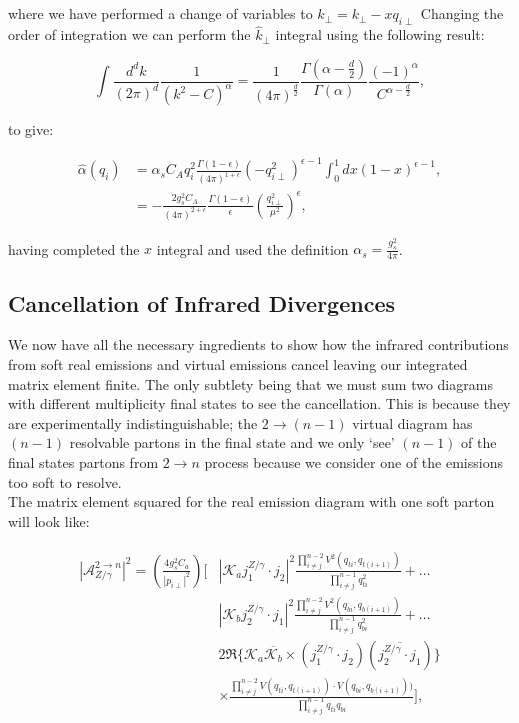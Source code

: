 		where we have performed a change of variables to $\hat{k}_\perp = k_\perp - xq_{i\perp}$
		Changing the order of integration we can perform the $\hat{k}_\perp$ integral
		using the following result:

		\begin{equation}
			\int \frac{d^dk}{(2\pi)^d}\frac{1}{(k^2 - C)^\alpha} = \frac{1}{(4\pi)^{\frac{d}{2}}}
				\frac{\Gamma(\alpha - \frac{d}{2})}{\Gamma(\alpha)}
				\frac{(-1)^\alpha}{C^{\alpha - \frac{d}{2}}},
		\end{equation}

		to give:

		\begin{align}
			\hat{\alpha}(q_i) &= \alpha_sC_Aq_i^2\frac{\Gamma(1-\epsilon)}{(4\pi)^{1+\epsilon}}
			(-q_{i\perp}^2)^{\epsilon-1}
			\int_0^1 dx(1-x)^{\epsilon-1}, \\
			&= -\frac{2g_s^2C_A}{(4\pi)^{2+\epsilon}}\frac{\Gamma(1-\epsilon)}{\epsilon}
			\left(\frac{q_{i\perp}^2}{\mu^2}\right)^\epsilon,
		\end{align}

		having completed the $x$ integral and used the definition $\alpha_s=\frac{g_s^2}{4\pi}$.

	\subsection{Cancellation of Infrared Divergences}
		\label{sub:cancellation}

		We now have all the necessary ingredients to show how the infrared contributions from
		soft real emissions and virtual emissions cancel leaving our integrated matrix element
		finite.  The only subtlety being that we must sum two diagrams with different multiplicity
		final states to see the cancellation.  This is because they are experimentally indistinguishable;
		the $2\rightarrow (n-1)$ virtual diagram has $(n-1)$ resolvable partons in the final state
		and we only `see' $(n-1)$ of the final states partons from $2\rightarrow n$ process because
		we consider one of the emissions too soft to resolve.\\
		The matrix element squared for the real emission diagram with one soft parton
		will look like:

		\begin{align}
		\begin{split}
			|\mathcal{A}_{Z/\gamma}^{2\rightarrow n}|^2 = \left(\frac{4g_s^2C_a}{|p_{i\perp}|^2}\right)
				\Bigg[&\left|\mathcal{K}_a j_1^{Z/\gamma}\cdot j_2\right|^2
				\frac{\prod^{n-2}_{i\neq j}V^2(q_{ti},
				q_{t(i+1)})}{\prod^{n-1}_{i\neq j}q^2_{ti}} + \ldots \\
				&\left|\mathcal{K}_b j_2^{Z/\gamma}\cdot j_1\right|^2
				\frac{\prod^{n-2}_{i\neq j}V^2(q_{bi}, q_{b(i+1)})}{\prod^{n-1}_{i\neq j}q^2_{bi}} + \ldots \\
				&2\Re\{\mathcal{K}_a\overline{\mathcal{K}_b} \times
				(j_1^{Z/\gamma}\cdot j_2)(\overline{j_2^{Z/\gamma}\cdot j_1})\}\\
				&\times\frac{\prod^{n-2}_{i\neq j}V(q_{ti}, q_{t(i+1)})\cdot V(q_{bi}, q_{b(i+1)}))}
				{\prod^{n-1}_{i\neq j}q_{ti}q_{bi}}\Bigg],
		\end{split}
		\end{align}

